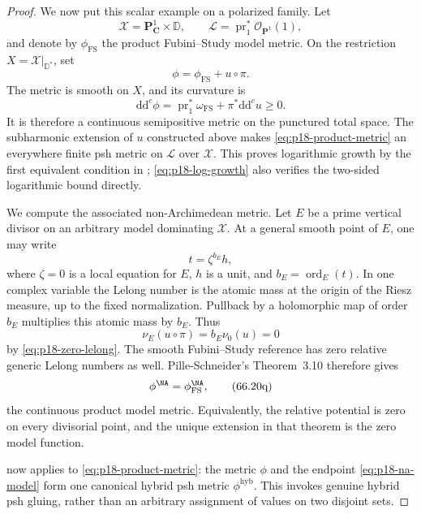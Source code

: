 \begin{proof}
We now put this scalar example on a polarized family.  Let
\[
 \mathcal X=\mathbf P^1_{\mathbf C}\times\mathbb D,\qquad
 \mathcal L=\operatorname{pr}_1^*\mathcal O_{\mathbf P^1}(1),
\]
and denote by \(\phi_{\mathrm{FS}}\) the product Fubini--Study model
metric.  On the restriction \(X=\mathcal X|_{\mathbb D^*}\), set
\[
                       \phi=\phi_{\mathrm{FS}}+u\circ\pi .
\tag{66.20n}\label{eq:p18-product-metric}
\]
The metric is smooth on \(X\), and its curvature is
\[
 \mathrm d\mathrm d^c\phi
 =
 \operatorname{pr}_1^*\omega_{\mathrm{FS}}
 +\pi^*\mathrm d\mathrm d^c u
 \geq0.
\tag{66.20o}\label{eq:p18-positive-curvature}
\]
It is therefore a continuous semipositive metric on the punctured total
space.  The subharmonic extension of \(u\) constructed above makes
\eqref{eq:p18-product-metric} an everywhere finite psh metric on
\(\mathcal L\) over \(\mathcal X\).  This proves logarithmic growth by
the first equivalent condition in \cite[Definition~3.9]{PS23Hybrid};
\eqref{eq:p18-log-growth} also verifies the two-sided logarithmic bound
directly.

We compute the associated non-Archimedean metric.  Let \(E\) be a prime
vertical divisor on an arbitrary model dominating \(\mathcal X\).  At a
general smooth point of \(E\), one may write
\[
                          t=\zeta^{b_E}h,
\]
where \(\zeta=0\) is a local equation for \(E\), \(h\) is a unit, and
\(b_E=\operatorname{ord}_E(t)\).  In one complex variable the Lelong
number is the atomic mass at the origin of the Riesz measure, up to the
fixed normalization.  Pullback by a holomorphic map of order \(b_E\)
multiplies this atomic mass by \(b_E\).  Thus
\[
                 \nu_E(u\circ\pi)
                 =b_E\nu_0(u)=0
\tag{66.20p}\label{eq:p18-all-divisorial-zero}
\]
by \eqref{eq:p18-zero-lelong}.  The smooth Fubini--Study reference has
zero relative generic Lelong numbers as well.  Pille-Schneider's
Theorem~3.10 therefore gives
\[
                  \phi^{\NA}
                  =\phi_{\mathrm{FS}}^{\NA},
\tag{66.20q}\label{eq:p18-na-model}
\]
the continuous product model metric.  Equivalently, the relative
potential is zero on every divisorial point, and the unique extension in
that theorem is the zero model function.

\cite[Theorem~3.13]{PS23Hybrid} now applies to
\eqref{eq:p18-product-metric}: the metric \(\phi\) and the endpoint
\eqref{eq:p18-na-model} form one canonical hybrid psh metric
\(\phi^{\mathrm{hyb}}\).  This invokes genuine hybrid psh gluing, rather
than an arbitrary assignment of values on two disjoint sets.


\end{proof}
